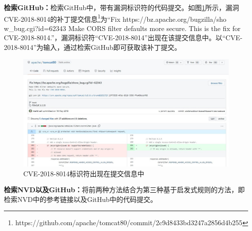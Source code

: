 \textbf{检索GitHub：}检索GitHub中，带有漏洞标识符的代码提交。如图\ref{fig:commitmessage}所示，漏洞CVE-2018-8014的补丁提交信息\footnote{https://github.com/apache/tomcat80/commit/2c9d8433bd3247a2856d4b255}为“Fix https://bz.apache.org/bugzilla/sho\\w\_bug.cgi?id=62343 Make CORS filter defaults more secure. This is the fix for CVE-2018-8014.”，漏洞标识符“CVE-2018-8014”出现在该提交信息中。以“CVE-2018-8014”为输入，通过检索GitHub即可获取该补丁提交。%
\begin{figure}[!t]
    \centering
    \includegraphics[scale=0.45]{fig/CVE in commit message.jpg}
    \caption{CVE-2018-8014标识符出现在提交信息中}\label{fig:commitmessage}
\end{figure}

\textbf{检索NVD以及GitHub：}将前两种方法结合为第三种基于启发式规则的方法，即检索NVD中的参考链接以及GitHub中的代码提交。

